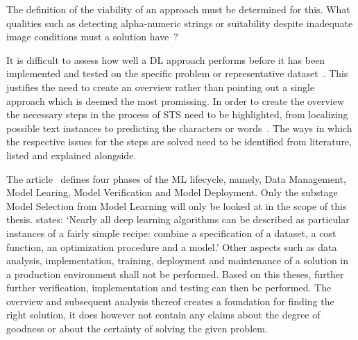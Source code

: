 The definition of the viability of an approach must be determined for this.
What qualities such as detecting alpha-numeric strings or suitability despite
inadequate image conditions must a solution have~\citep{ghosh_visual_2017, hu_gtc_2020}?

It is difficult to assess how well a \ac{DL} approach performs before it has been
implemented and tested on the specific problem or representative dataset~\citep{arpteg_software_2018}.
This justifies the need to create an overview rather than pointing out a single approach which is
deemed the most promissing.
In order to create the overview the necessary steps in the process of \ac{STS} need to be highlighted,
from localizing possible text instances to predicting the characters or
words~\citep{long_scene_2021, sourvanos_challenges_2018}.
The ways in which the respective issues for the steps are solved need to be
identified from literature, listed and explained alongside.

The article~\cite{ashmore_assuring_2021} defines four phases of the \ac{ML} lifecycle, namely,
Data Management, Model Learing, Model Verification and Model Deployment.
Only the substage Model Selection from Model Learning will only be looked at in the scope of this
thesis.
\cite{goodfellow_deep_2016} states:
`Nearly all deep learning algorithms can be described as particular instances of a fairly simple
recipe: combine a specification of a dataset, a cost function, an optimization procedure and a model.'
Other aspects such as data analysis, implementation, training, deployment and maintenance of a
solution in a production environment shall not be performed.
Based on this theses, further further verification, implementation and testing can then be performed.
The overview and subsequent analysis thereof creates a foundation for finding the right solution,
it does however not contain any claims about the degree of goodness or about the certainty of
solving the given problem.


\begin{comment}
Abgrenzung für Training NN
- no talk about Setup (preprocessing, weight initialization,regularization)
- No talk about training dynamics (learning rate,large batch training, hyperparameter)
- No after training ( transfer learning, model ensemble)
\end{comment}

